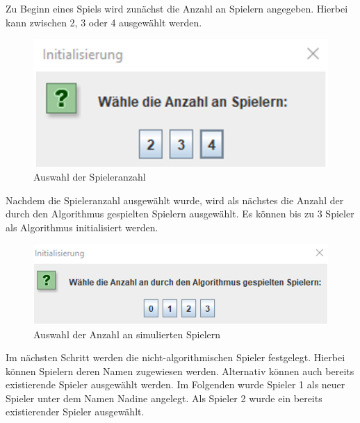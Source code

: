 \noindent Zu Beginn eines Spiels wird zunächst die Anzahl an Spielern angegeben. Hierbei kann zwischen 2, 3 oder 4 ausgewählt werden.

\begin{figure}[htbp]
\centering
\centerline{\includegraphics[scale=.5]{anleitung1}}
\caption{Auswahl der Spieleranzahl}
\label{fig:anleitung1}
\end{figure}

\noindent Nachdem die Spieleranzahl ausgewählt wurde, wird als nächstes die Anzahl der durch den Algorithmus gespielten Spielern ausgewählt. Es können bis zu 3 Spieler als Algorithmus initialisiert werden.

\begin{figure}[htbp]
\centering
\centerline{\includegraphics[scale=.5]{anleitung2}}
\caption{Auswahl der Anzahl an simulierten Spielern}
\label{fig:anleitung2}
\end{figure}

\noindent Im nächsten Schritt werden die nicht-algorithmischen Spieler festgelegt. Hierbei können Spielern deren Namen zugewiesen werden. Alternativ können auch bereits existierende Spieler ausgewählt werden. Im Folgenden wurde Spieler 1 als neuer Spieler unter dem Namen Nadine angelegt. Als Spieler 2 wurde ein bereits existierender Spieler ausgewählt.

\newpage


